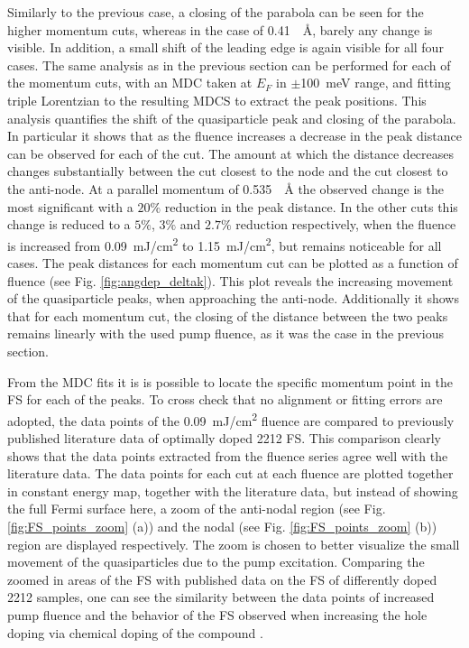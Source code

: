 Similarly to the previous case, a closing of the parabola can be seen for the higher momentum cuts, whereas in the case of \qty{0.41}{\per\angstrom}, barely any change is visible.
In addition, a small shift of the leading edge is again visible for all four cases.
The same analysis as in the previous section can be performed for each of the momentum cuts, with an MDC taken at $E_F$ in $\pm$\qty{100}{\milli\electronvolt} range, and fitting triple Lorentzian to the resulting MDCS to extract the peak positions.
This analysis quantifies the shift of the quasiparticle peak and closing of the parabola.
In particular it shows that as the fluence increases a decrease in the peak distance can be observed for each of the cut.
The amount at which the distance decreases changes substantially between the cut closest to the node and the cut closest to the anti-node.
At a parallel momentum of \qty{0.535}{\per\angstrom} the observed change is the most significant with a $20\%$ reduction in the peak distance.
In the other cuts this change is reduced to a $5\%$, $3\%$ and $2.7\%$ reduction respectively, when the fluence is increased from \qty{0.09}{\milli\joule/\centi\meter\squared} to \qty{1.15}{\milli\joule/\centi\meter\squared}, but remains noticeable for all cases.
The peak distances for each momentum cut can be plotted as a function of fluence (see Fig. \ref{fig:angdep_deltak}).
This plot reveals the increasing movement of the quasiparticle peaks, when approaching the anti-node.
Additionally it shows that for each momentum cut, the closing of the distance between the two peaks remains linearly with the used pump fluence, as it was the case in the previous section.

From the MDC fits it is is possible to locate the specific momentum point in the FS for each of the peaks.
To cross check that no alignment or fitting errors are adopted, the data points of the \qty{0.09}{\milli\joule/\centi\meter\squared} fluence are compared to previously published literature data of optimally doped 2212 FS.
This comparison clearly shows that the data points extracted from the fluence series agree well with the literature data.
The data points for each cut at each fluence are plotted together in constant energy map, together with the literature data, but instead of showing the full Fermi surface here, a zoom of the anti-nodal region (see Fig. \ref{fig:FS_points_zoom} (a)) and the nodal (see Fig. \ref{fig:FS_points_zoom} (b)) region are displayed respectively.
The zoom is chosen to better visualize the small movement of the quasiparticles due to the pump excitation.
Comparing the zoomed in areas of the FS with published data on the FS of differently doped 2212 samples, one can see the similarity between the data points of increased pump fluence and the behavior of the FS observed when increasing the hole doping via chemical doping of the compound \cite{drozdov_phase_2018}.

